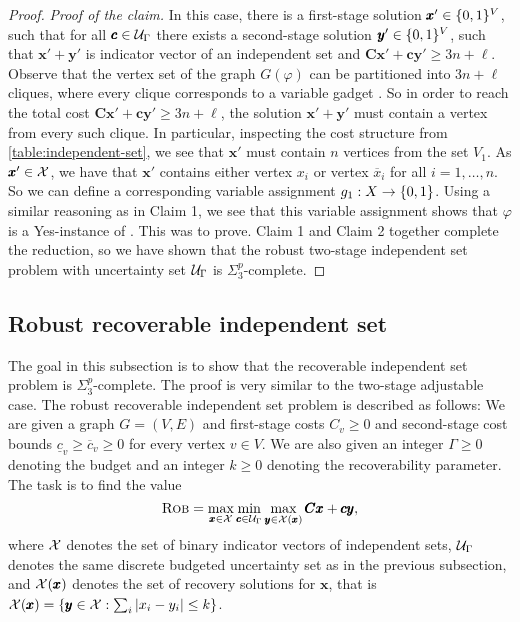 \begin{proof}
\emph{Proof of the claim.} 
In this case, there is a first-stage solution $\pmb x' \in \{ 0,1 \}^V$, such that for all $\pmb c \in \mathcal{U}_\Gamma$ there exists a second-stage solution $\pmb y' \in \{ 0,1 \}^V$, 
such that $\pmb x'  + \pmb y'$ is indicator vector of an independent set and $\pmb C\pmb x' + \pmb c\pmb y' \geq 3n + \ell$. 
Observe that the vertex set of the graph $G(\varphi)$ can be partitioned into $3n + \ell$ cliques, where every clique corresponds to a variable gadget .
So in order to reach the total cost $\pmb C\pmb x' + \pmb c\pmb y' \geq 3n + \ell$, the solution $\pmb x' + \pmb y'$ must contain a vertex from every such clique. 
In particular, inspecting the cost structure from \cref{table:independent-set}, we see that $\pmb x'$ must contain $n$ vertices from the set $V_1$. 
As $\pmb x' \in \mathcal{X}$, we have that $\pmb x'$ contains either vertex $x_i$ or vertex $\overline{x}_i$ for all $i=1,\dots,n$. 
So we can define a corresponding variable assignment $g_1 : X \rightarrow \{ 0,1 \}$. 
Using a similar reasoning as in Claim 1, we see that this variable assignment shows that $\varphi$ is a Yes-instance of {\radj}. 
This was to prove. Claim 1 and Claim 2 together complete the reduction, so we have shown that the robust two-stage independent set problem with uncertainty set $\mathcal{U}_\Gamma$ is $\Sigma_3^p$-complete.
\end{proof}


\subsection{Robust recoverable independent set}
\label{subsec:rec-ind-set}

The goal in this subsection is to show that the recoverable independent set problem is $\Sigma_3^p$-complete. 
The proof is very similar to the two-stage adjustable case. 
The robust recoverable independent set problem is described as follows: 
We are given a graph $G = (V,E)$ and first-stage costs $C_v \geq 0$ and second-stage cost bounds $\underline{c}_v \geq \overline{c}_v \geq 0$ for every vertex $v \in V$. 
We are also given an integer $\Gamma \geq 0$ denoting the budget and an integer $k \geq 0$ denoting the recoverability parameter. 
The task is to find the value 
\begin{equation}
 \textsc{Rob} = \max_{\pmb x  \in \mathcal{X}} \min_{\pmb c \in \mathcal{U}_\Gamma } \max_{\pmb y \in \mathcal{X}(\pmb x) } \pmb C \pmb x + \pmb c \pmb y, \label{eq:recoverable-ind-set}
 \end{equation}
where $\mathcal{X}$ denotes the set of binary indicator vectors of independent sets, $\mathcal{U}_\Gamma$ denotes the same discrete budgeted uncertainty set as in the previous subsection, and $\mathcal{X}(\pmb x)$ denotes the set of recovery solutions for $\pmb x$, that is $\mathcal{X}(\pmb x) = \{ \pmb y \in \mathcal{X} : \sum_i |x_i - y_i| \leq k \}$.



